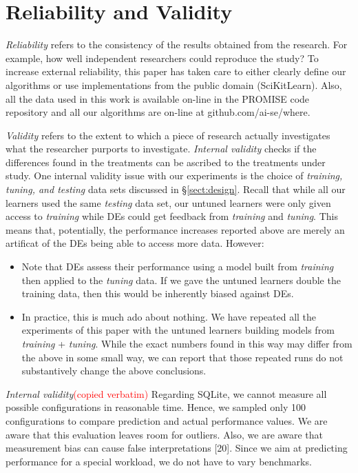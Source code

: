 \documentclass{sig-alternative}
\newcommand{\bi}{\begin{itemize}[leftmargin=0.4cm]}
\newcommand{\ei}{\end{itemize}}
\newcommand{\tion}[1]{\S\ref{sect:#1}}
\begin{document}
 
 
\section{Reliability and Validity}\label{sect:construct}


{\em Reliability} refers to the consistency of the results obtained
from the research.  For example,   how well independent researchers
could reproduce the study? To increase external
reliability, this paper has taken care to either  clearly define our
algorithms or use implementations from the public domain
(SciKitLearn). Also, all the data used in this work is available
on-line in the PROMISE code repository and all our algorithms
are on-line at github.com/ai-se/where.


{\em Validity} refers to the extent to which a piece of research actually
investigates what the researcher purports to investigate.
{\em Internal validity} checks if the differences found in
the treatments can be ascribed to the treatments under study. 
One internal validity issue with our experiments is the choice
of {\em training, tuning, and testing} data sets discussed in 
\tion{design}. Recall that while all our learners used the same
{\em testing} data set, our untuned learners were only given
access to {\em training} while DEs could get feedback from
{\em training} and
{\em tuning}.  This means that, potentially,  the performance increases
reported above are merely an artificat of the DEs being able to access
more data. However:
\bi
\item Note that
DEs assess their performance using a model built from {\em training}
then applied to the {\em tuning} data. If we gave the untuned
learners double the training data, then this would be inherently
biased against DEs.
\item In practice, this is much ado about nothing. We have
repeated all the experiments of this paper with the untuned
learners building models from {\em training} + {\em tuning}.
While the exact numbers found in this way
may differ from the above in some small way, we can report that 
those repeated runs do not substantively change the above conclusions.
\ei

{\em Internal validity}\textcolor{red}{(copied verbatim)}
Regarding SQLite, we cannot measure all possible configurations in reasonable time. Hence, we sampled only 100 configurations to compare prediction and actual performance values. We are aware that this evaluation leaves room for outliers.
Also, we are aware that measurement bias can cause false interpretations [20]. Since we aim at predicting performance for a special workload, we do not have to vary benchmarks.
\end{document}
